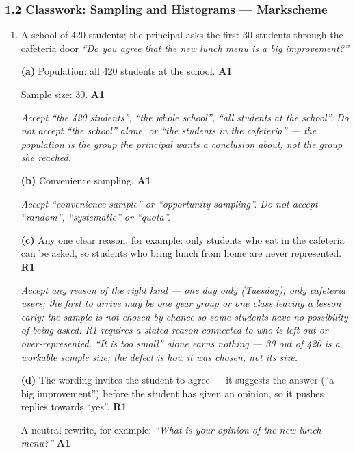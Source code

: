\documentclass[12pt, twoside]{article}
\begin{document}
\subsubsection*{1.2 Classwork: Sampling and Histograms --- Markscheme}

\begin{enumerate}[itemsep=0.3cm]

\item[1.] [Maximum mark: 8]

A school of 420 students; the principal asks the first 30 students
through the cafeteria door \emph{``Do you agree that the new lunch menu
is a big improvement?''}

\textbf{(a)} Population: all 420 students at the school. \hfill \textbf{A1}

Sample size: 30. \hfill \textbf{A1}

\emph{Accept ``the 420 students'', ``the whole school'', ``all students at
the school''. Do not accept ``the school'' alone, or ``the students in the
cafeteria'' --- the population is the group the principal wants a
conclusion about, not the group she reached.}

\textbf{(b)} Convenience sampling. \hfill \textbf{A1}

\emph{Accept ``convenience sample'' or ``opportunity sampling''. Do not
accept ``random'', ``systematic'' or ``quota''.}

\textbf{(c)} Any one clear reason, for example: only students who eat in
the cafeteria can be asked, so students who bring lunch from home are
never represented. \hfill \textbf{R1}

\emph{Accept any reason of the right kind --- one day only (Tuesday);
only cafeteria users; the first to arrive may be one year group or one
class leaving a lesson early; the sample is not chosen by chance so some
students have no possibility of being asked. R1 requires a stated reason
connected to \emph{who is left out or over-represented}. ``It is too
small'' alone earns nothing --- 30 out of 420 is a workable sample size;
the defect is how it was chosen, not its size.}

\textbf{(d)} The wording invites the student to agree --- it suggests the
answer (``a big improvement'') before the student has given an opinion,
so it pushes replies towards ``yes''. \hfill \textbf{R1}

A neutral rewrite, for example: \emph{``What is your opinion of the new
lunch menu?''} \hfill \textbf{A1}


\end{enumerate}
\end{document}
